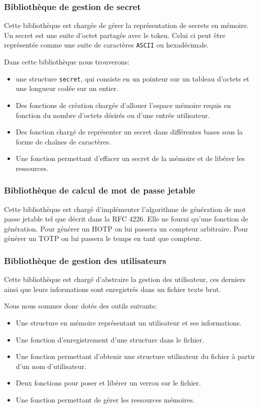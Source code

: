 \subsubsection{Bibliothèque de gestion de secret}
Cette bibliothèque est chargée de gérer la représentation de secrets en mémoire.
Un secret est une suite d'octet partagée avec le token. Celui ci peut être 
représentée comme une suite de caractères \verb?ASCII? ou hexadécimale.

Dans cette bibliothèque nous trouverons:
\begin{itemize}
  \item une structure \verb?secret?, qui consiste en un pointeur sur un tableau 
  d'octets et une longueur codée sur un entier.
  \item Des fonctions de création chargée d'allouer l'espace mémoire requis en
  fonction du nombre d'octets désirés ou d'une entrée utilisateur.
  \item Des fonction chargé de représenter un secret dans différentes bases
  sous la forme de chaînes de caractères.
  \item Une fonction permettant d'effacer un secret de la mémoire et de 
  libérer les ressources.
\end{itemize}

\subsubsection{Bibliothèque de calcul de mot de passe jetable}
Cette bibliothèque est chargé d'implémenter l'algorithme de génération de mot
passe jetable tel que décrit dans la RFC 4226\cite{HOTPrfc}. Elle ne fourni
qu'une fonction de génération. Pour générer un HOTP on lui passera un compteur
arbitraire. Pour générer un TOTP on lui passera le temps en tant que compteur.

\subsubsection{Bibliothèque de gestion des utilisateurs}
Cette bibliothèque est chargé d'abstraire la gestion des utilisateur, ces
derniers ainsi que leurs informations sont enregistrés dans un fichier texte
brut.

Nous nous sommes donc dotés des outils suivants:
\begin{itemize}
  \item Une structure en mémoire représentant un utilisateur et ses 
  informations.
  \item Une fonction d'enregistrement d'une structure dans le fichier.
  \item Une fonction permettant d'obtenir une structure utilisateur du fichier 
  à partir d'un nom d'utilisateur.
  \item Deux fonctions pour poser et libérer un verrou sur le fichier.
  \item Une fonction permettant de gérer les ressources mémoires.\\
\end{itemize}

